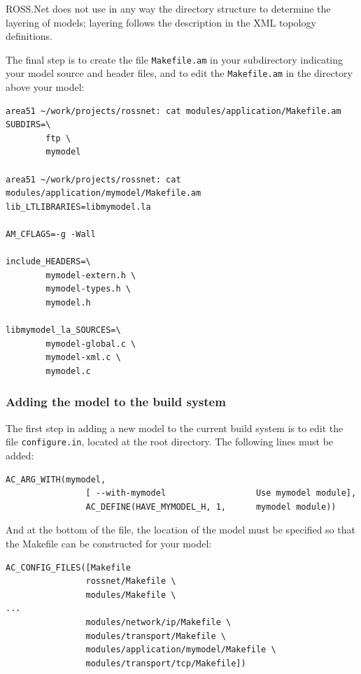 \documentclass[conference,onecolumn]{IEEEtran}
\begin{document}
ROSS.Net does not use in any way the directory structure to determine the layering of models; layering follows the description in the XML topology definitions.

The final step is to create the file {\tt Makefile.am} in your subdirectory indicating your model source and header files, and to edit the {\tt Makefile.am} in the directory above your model:

\begin{small}\begin{verbatim}
area51 ~/work/projects/rossnet: cat modules/application/Makefile.am
SUBDIRS=\
        ftp \
        mymodel

area51 ~/work/projects/rossnet: cat modules/application/mymodel/Makefile.am
lib_LTLIBRARIES=libmymodel.la

AM_CFLAGS=-g -Wall

include_HEADERS=\
        mymodel-extern.h \
        mymodel-types.h \
        mymodel.h

libmymodel_la_SOURCES=\
        mymodel-global.c \
        mymodel-xml.c \
        mymodel.c
\end{verbatim}\end{small}

\subsubsection{Adding the model to the build system}

The first step in adding a new model to the current build system is to edit the file {\tt configure.in}, located at the root directory.  The following lines must be added:

\begin{small}\begin{verbatim}
AC_ARG_WITH(mymodel,
                [ --with-mymodel                  Use mymodel module],
                AC_DEFINE(HAVE_MYMODEL_H, 1,      mymodel module))
\end{verbatim}\end{small}

And at the bottom of the file, the location of the model must be specified so that the Makefile can be constructed for your model:

\begin{small}\begin{verbatim}
AC_CONFIG_FILES([Makefile
                rossnet/Makefile \
                modules/Makefile \
...
                modules/network/ip/Makefile \
                modules/transport/Makefile \
                modules/application/mymodel/Makefile \
                modules/transport/tcp/Makefile])
\end{verbatim}\end{small}
\end{document}
